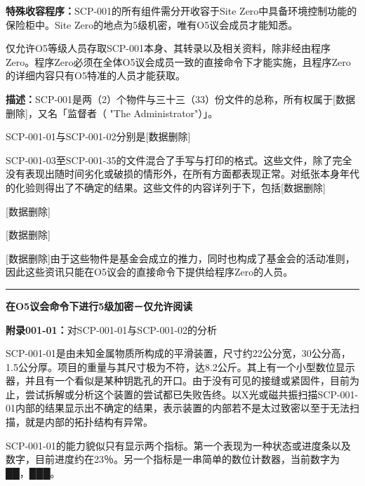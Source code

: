 \documentclass[openany,a4paper]{book} %
\begin{document}
\textbf{特殊收容程序：}SCP-001的所有组件需分开收容于Site Zero中具备环境控制功能的保险柜中。Site Zero的地点为5级机密，唯有O5议会成员才能知悉。\vspace{12pt}

仅允许O5等级人员存取SCP-001本身、其转录以及相关资料，除非经由程序Zero。程序Zero必须在全体O5议会成员一致的直接命令下才能实施，且程序Zero的详细内容只有O5特准的人员才能获取。\vspace{12pt}

\textbf{描述：}SCP-001是两（2）个物件与三十三（33）份文件的总称，所有权属于[数据删除]，又名「监督者（ "The Administrator"）」。\vspace{12pt}

SCP-001-01与SCP-001-02分别是[数据删除]\vspace{12pt}

SCP-001-03至SCP-001-35的文件混合了手写与打印的格式。这些文件，除了完全没有表现出随时间劣化或破损的情形外，在所有方面都表现正常。对纸张本身年代的化验则得出了不确定的结果。这些文件的内容详列于下，包括[数据删除]\vspace{12pt}

[数据删除]\vspace{12pt}

[数据删除]\vspace{12pt}

[数据删除]由于这些物件是基金会成立的推力，同时也构成了基金会的活动准则，因此这些资讯只能在O5议会的直接命令下提供给程序Zero的人员。\vspace{12pt}

\hrule\vspace{12pt}

{\color{red}\large\textbf{在O5议会命令下进行5级加密－仅允许阅读}}\vspace{15pt}

\textbf{附录001-01：}对SCP-001-01与SCP-001-02的分析\vspace{12pt}

SCP-001-01是由未知金属物质所构成的平滑装置，尺寸约22公分宽，30公分高，1.5公分厚。项目的重量与其尺寸极为不符，达8.2公斤。其上有一个小型数位显示器，并且有一个看似是某种钥匙孔的开口。由于没有可见的接缝或紧固件，目前为止，尝试拆解或分析这个装置的尝试都已失败告终。以X光或磁共振扫描SCP-001-01内部的结果显示出不确定的结果，表示装置的内部若不是太过致密以至于无法扫描，就是内部的拓扑结构有异常。

SCP-001-01的能力貌似只有显示两个指标。第一个表现为一种状态或进度条以及数字，目前进度约在23％。另一个指标是一串简单的数位计数器，当前数字为██，███。\vspace{12pt}
\end{document}
